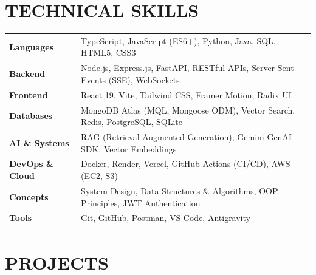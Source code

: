 \documentclass[a4paper,9.5pt]{article}
\begin{document}
\section*{TECHNICAL SKILLS}
\begin{tabular}{@{}p{2.8cm} p{14cm}}
\textbf{Languages} & TypeScript, JavaScript (ES6+), Python, Java, SQL, HTML5, CSS3 \\[1pt]
\textbf{Backend}   & Node.js, Express.js, FastAPI, RESTful APIs, Server-Sent Events (SSE), WebSockets \\[1pt]
\textbf{Frontend}  & React 19, Vite, Tailwind CSS, Framer Motion, Radix UI \\[1pt]
\textbf{Databases} & MongoDB Atlas (MQL, Mongoose ODM), Vector Search, Redis, PostgreSQL, SQLite \\[1pt]
\textbf{AI \& Systems} & RAG (Retrieval-Augmented Generation), Gemini GenAI SDK, Vector Embeddings \\[1pt]
\textbf{DevOps \& Cloud} & Docker, Render, Vercel, GitHub Actions (CI/CD), AWS (EC2, S3) \\[1pt]
\textbf{Concepts}  & System Design, Data Structures \& Algorithms, OOP Principles, JWT Authentication \\[1pt]
\textbf{Tools}     & Git, GitHub, Postman, VS Code, Antigravity
\end{tabular}

\section*{PROJECTS}
\end{document}
